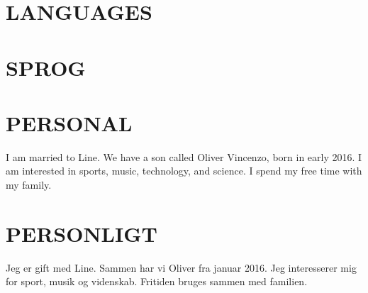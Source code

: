 \documentclass[11pt,a4paper,sans]{moderncv}        %
\begin{document}
\ifenglish
\section{LANGUAGES}
\else
\section{SPROG}
\fi

\ifenglish
\section{PERSONAL}
I am married to Line. We have a son called Oliver Vincenzo, born in early 2016. I am interested in sports, music, technology, and science. I spend my free time with my family.
\else
\section{PERSONLIGT}
Jeg er gift med Line. Sammen har vi Oliver fra januar 2016. Jeg interesserer mig for sport, musik og videnskab. Fritiden bruges sammen med familien.
\fi
\end{document}
